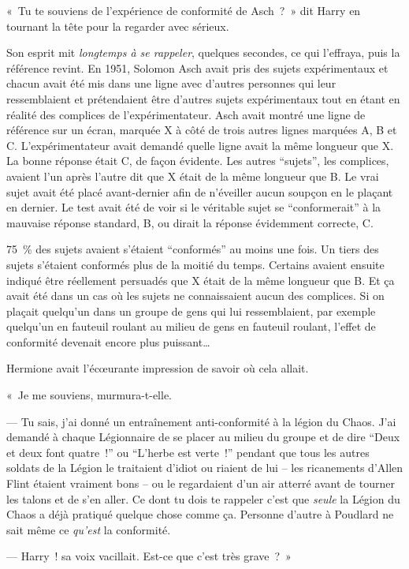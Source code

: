 «~Tu te souviens de l'expérience de conformité de Asch~?~» dit Harry en tournant la tête pour la regarder avec sérieux.

Son esprit mit \emph{longtemps à se rappeler}, quelques secondes, ce qui l'effraya, puis la référence revint. En 1951, Solomon Asch avait pris des sujets expérimentaux et chacun avait été mis dans une ligne avec d'autres personnes qui leur ressemblaient et prétendaient être d'autres sujets expérimentaux tout en étant en réalité des complices de l'expérimentateur. Asch avait montré une ligne de référence sur un écran, marquée X à côté de trois autres lignes marquées A, B et C. L'expérimentateur avait demandé quelle ligne avait la même longueur que X. La bonne réponse était C, de façon évidente. Les autres “sujets”, les complices, avaient l'un après l'autre dit que X était de la même longueur que B. Le vrai sujet avait été placé avant-dernier afin de n'éveiller aucun soupçon en le plaçant en dernier. Le test avait été de voir si le véritable sujet se “conformerait” à la mauvaise réponse standard, B, ou dirait la réponse évidemment correcte, C.

75~\% des sujets avaient s'étaient “conformés” au moins une fois. Un tiers des sujets s'étaient conformés plus de la moitié du temps. Certains avaient ensuite indiqué être réellement persuadés que X était de la même longueur que B. Et ça avait été dans un cas où les sujets ne connaissaient aucun des complices. Si on plaçait quelqu'un dans un groupe de gens qui lui ressemblaient, par exemple quelqu'un en fauteuil roulant au milieu de gens en fauteuil roulant, l'effet de conformité devenait encore plus puissant…

Hermione avait l'écœurante impression de savoir où cela allait.

«~Je me souviens, murmura-t-elle.

--- Tu sais, j'ai donné un entraînement anti-conformité à la légion du Chaos. J'ai demandé à chaque Légionnaire de se placer au milieu du groupe et de dire “Deux et deux font quatre~!” ou “L'herbe est verte~!” pendant que tous les autres soldats de la Légion le traitaient d'idiot ou riaient de lui -- les ricanements d'Allen Flint étaient vraiment bons -- ou le regardaient d'un air atterré avant de tourner les talons et de s'en aller. Ce dont tu dois te rappeler c'est que \emph{seule} la Légion du Chaos a déjà pratiqué quelque chose comme ça. Personne d'autre à Poudlard ne sait même ce \emph{qu'est} la conformité.

--- Harry~! sa voix vacillait. Est-ce que c'est très grave~?~»

